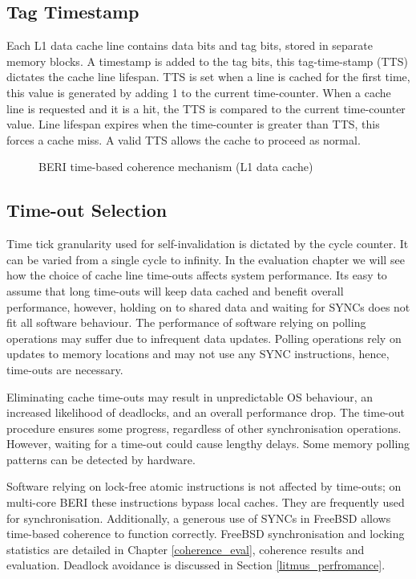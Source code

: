 	\subsection{Tag Timestamp}
		Each L1 data cache line contains data bits and tag bits, stored in separate memory blocks. A timestamp is added to the tag bits, this tag-time-stamp (TTS) dictates the cache line lifespan. TTS is set when a line is cached for the first time, this value is generated by adding 1 to the current time-counter.
		When a cache line is requested and it is a hit, the TTS is compared to the current time-counter value. Line lifespan expires when the time-counter is greater than TTS, this forces a cache miss. A valid TTS allows the cache to proceed as normal.

		\begin{figure}[t]
			\centering 
				\caption[BERI time-based coherence mechanism]{BERI time-based coherence mechanism (L1 data cache)} 
				\label{beri_timebased_algorithm}
		\end{figure}
	
	\subsection{Time-out Selection}
		Time tick granularity used for self-invalidation is dictated by the cycle counter. It can be varied from a single cycle to infinity. In the evaluation chapter we will see how the choice of cache line time-outs affects system performance. Its easy to assume that long time-outs will keep data cached and benefit overall performance, however, holding on to shared data and waiting for SYNCs does not fit all software behaviour. 		
		The performance of software relying on polling operations may suffer due to infrequent data updates. Polling operations rely on updates to memory locations and may not use any SYNC instructions, hence, time-outs are necessary. 
		
		Eliminating cache time-outs may result in unpredictable OS behaviour, an increased likelihood of deadlocks, and an overall performance drop. 
		The time-out procedure ensures some progress, regardless of other synchronisation operations. However, waiting for a time-out could cause lengthy delays. Some memory polling patterns can be detected by hardware.
		
		Software relying on lock-free atomic instructions is not affected by time-outs; on multi-core BERI these instructions bypass local caches. They are frequently used for synchronisation. Additionally, a generous use of SYNCs in FreeBSD allows time-based coherence to function correctly. FreeBSD synchronisation and locking statistics are detailed in Chapter \ref{coherence_eval}, coherence results and evaluation. Deadlock avoidance is discussed in Section \ref{litmus_perfromance}.


